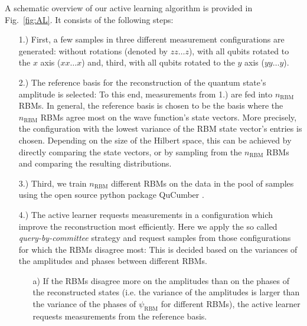 \documentclass[pra,aps,showpacs,groupedaddress,superscriptaddress,twocolumn,toc=flat,biblatex,footinbib]{revtex4-1}
\begin{document}
A schematic overview of our active learning algorithm is provided in Fig.~\ref{fig:AL}. It consists of the following steps: 
\begin{itemize}
    \item[1.)] First, a few samples in three different measurement configurations are generated: without rotations (denoted by $zz\dots z$), with all qubits rotated to the $x$ axis ($xx\dots x$) and, third, with all qubits rotated to the $y$ axis ($yy\dots y$).
    \item[2.)] The reference basis for the reconstruction of the quantum state's amplitude is selected: To this end, measurements from 1.) are fed into $n_{\mathrm{RBM}}$ RBMs. In general, the reference basis is chosen to be the basis where the $n_{\mathrm{RBM}}$ RBMs agree most on the wave function's state vectors. More precisely, the configuration with the lowest variance of the RBM state vector's entries is chosen. Depending on the size of the Hilbert space, this can be achieved by directly comparing the state vectors, or by sampling from the $n_{\mathrm{RBM}}$ RBMs and comparing the resulting distributions. 
    \item[3.)] Third, we
    train $n_{\mathrm{RBM}}$ different RBMs on the data in the pool of samples using the open source python package QuCumber \cite{Beach2019}.
    \item[4.)] The active learner requests measurements in a configuration which improve the reconstruction most efficiently. Here we apply the so called \textit{query-by-committee} strategy and request samples from those configurations for which the RBMs disagree most: This is decided based on the variances of the amplitudes and phases between different RBMs. \begin{itemize}
        \item [a)] If the RBMs disagree more on the amplitudes than on the phases of the reconstructed states (i.e. the variance of the amplitudes is larger than the variance of the phases of $\psi_{\mathrm{RBM}}$ for different RBMs), the active learner requests measurements from the reference basis.

\end{itemize}
\end{itemize}
\end{document}
